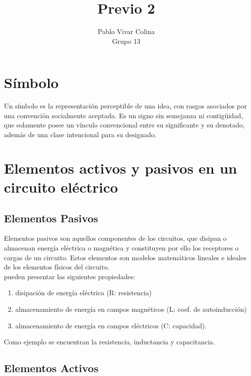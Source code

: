 \documentclass{article}
\title{Previo 2}
\author{Pablo Vivar Colina\\
Grupo 13\\
}
\begin{document}
\maketitle

\section{Símbolo}

Un símbolo es la representación perceptible de una idea, con rasgos asociados por una convención socialmente aceptada. Es un signo sin semejanza ni contigüidad, que solamente posee un vínculo convencional entre su significante y su denotado, además de una clase intencional para su designado.\citep{Sim}

\section{Elementos activos y pasivos en un circuito eléctrico}

\subsection{Elementos Pasivos}

Elementos pasivos son aquellos componentes de los circuitos, que disipan o almacenan energía eléctrica o magnética y constituyen por ello los receptores o cargas de un circuito. Estos elementos son modelos matemáticos lineales e ideales de los elementos físicos del circuito.\citep{EAP}\\

pueden presentar las siguientes propiedades:

\begin{enumerate}
    \item disipación de energía eléctrica (R: resistencia)
    \item almacenamiento de energía en campos magnéticos (L: coef. de autoinducción)
    \item almacenamiento de energía en campos eléctricos (C: capacidad).
\end{enumerate}
 
 Como ejemplo se encuentran la resistencia, inductancia y capacitancia.\citep{EAP}\\
 
 \subsection{Elementos Activos}
 
\end{document}
